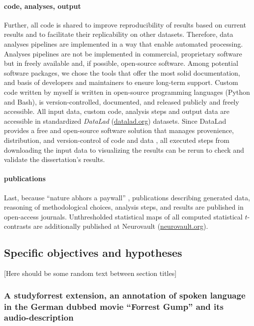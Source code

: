 \paragraph{code, analyses, output}

Further, all code is shared to improve reproducibility of results based on
current results and to facilitate their replicability on other datasets.
Therefore, data analyses pipelines are implemented in a way that enable
automated processing.
%
Analyses pipelines are not be implemented in commercial, proprietary software
but in freely available and, if possible, open-source software.
Among potential software packages, we chose the tools that offer the most solid
documentation, and basis of developers and maintainers to ensure long-term
support.
Custom code written by myself is written in open-source programming languages
(Python and Bash), is version-controlled, documented, and released publicly and
freely accessible.
%
All input data, custom code, analysis steps and output data are accessible in
standardized \textit{DataLad} (\href{www.datalad.org}{datalad.org}) datasets.
Since DataLad provides a free and open-source software solution that manages
provenience, distribution, and version-control of code and data
\citep{halchenko2021datalad}, all executed steps from downloading the input data
to visualizing the results can be rerun to check and validate the dissertation's
results.


\paragraph{publications}
Last, because ``nature abhors a paywall'' \citep{dupre2020nature}, publications
describing generated data, reasoning of methodological choices, analysis steps,
and results are published in open-access journals.
Unthresholded statistical maps of all computed statistical $t$-contrasts are
additionally published at Neurovault
(\href{https://neurovault.org/}{neurovault.org}).


\subsection{Specific objectives and hypotheses}

[Here should be some random text between section titles]

\subsubsection{A studyforrest extension, an annotation of spoken language in the
German dubbed movie ``Forrest Gump'' and its audio-description}

